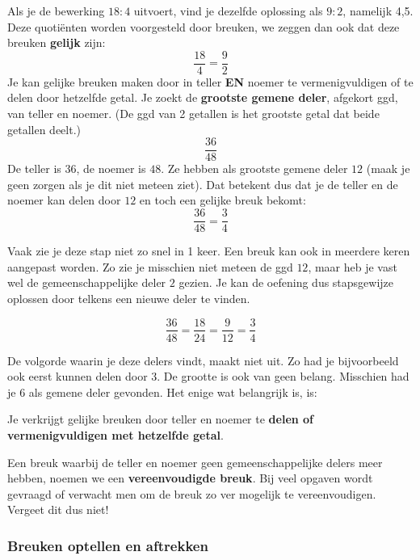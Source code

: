 Als je de bewerking $18:4$ uitvoert, vind je dezelfde oplossing als $9:2$, namelijk 4,5. Deze quoti\"enten worden voorgesteld door breuken, we zeggen dan ook dat deze breuken \textbf{gelijk} zijn:
\begin{equation*}
\frac{18}{4}=\frac{9}{2}
\end{equation*}
Je kan gelijke breuken maken door in teller \textbf{EN} noemer te vermenigvuldigen of te delen door hetzelfde getal. Je zoekt de \textbf{grootste gemene deler}, afgekort ggd, van teller en noemer. (De ggd van 2 getallen is het grootste getal dat beide getallen deelt.)
\begin{equation*}
\frac{36}{48}
\end{equation*}
De teller is $36$, de noemer is $48$. Ze hebben als grootste gemene deler $12$ (maak je geen zorgen als je dit niet meteen ziet). Dat betekent dus dat je de teller en de noemer kan delen door $12$ en toch een gelijke breuk bekomt:
\begin{equation*}
\frac{36}{48}=\frac{3}{4}
\end{equation*}


Vaak zie je deze stap niet zo snel in 1 keer. Een breuk kan ook in meerdere keren aangepast worden. Zo zie je misschien niet meteen de ggd $12$, maar heb je vast wel de gemeenschappelijke deler $2$ gezien. Je kan de oefening dus stapsgewijze oplossen door telkens een nieuwe deler te vinden.

\begin{equation*}
\frac{36}{48}=\frac{18}{24}=\frac{9}{12}=\frac{3}{4}
\end{equation*}

De volgorde waarin je deze delers vindt, maakt niet uit. Zo had je bijvoorbeeld ook eerst kunnen delen door $3$. De grootte is ook van geen belang. Misschien had je $6$ als gemene deler gevonden. Het enige wat belangrijk is, is:

\begin{ftonthoud}
	Je verkrijgt gelijke breuken door teller en noemer te \textbf{delen of vermenigvuldigen met hetzelfde getal}.
\end{ftonthoud}


Een breuk waarbij de teller en noemer geen gemeenschappelijke delers meer hebben, noemen we een \textbf{vereenvoudigde breuk}. Bij veel opgaven wordt gevraagd of verwacht men om de breuk zo ver mogelijk te vereenvoudigen. Vergeet dit dus niet!

\subsubsection{Breuken optellen en aftrekken}


